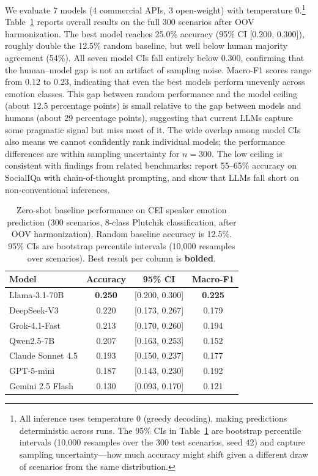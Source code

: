 \documentclass[twoside,11pt]{article}
\begin{document}
We evaluate 7 models (4 commercial APIs, 3 open-weight) with temperature 0.\footnote{All inference uses temperature 0 (greedy decoding), making predictions deterministic across runs. The 95\% CIs in Table~\ref{tab:baselines} are bootstrap percentile intervals (10{,}000 resamples over the 300 test scenarios, seed 42) and capture sampling uncertainty---how much accuracy might shift given a different draw of scenarios from the same distribution.} Table~\ref{tab:baselines} reports overall results on the full 300 scenarios after OOV harmonization. The best model reaches 25.0\% accuracy (95\% CI [0.200, 0.300]), roughly double the 12.5\% random baseline, but well below human majority agreement (54\%). All seven model CIs fall entirely below 0.300, confirming that the human--model gap is not an artifact of sampling noise. Macro-F1 scores range from 0.12 to 0.23, indicating that even the best models perform unevenly across emotion classes. This gap between random performance and the model ceiling (about 12.5 percentage points) is small relative to the gap between models and humans (about 29 percentage points), suggesting that current LLMs capture some pragmatic signal but miss most of it. The wide overlap among model CIs also means we cannot confidently rank individual models; the performance differences are within sampling uncertainty for $n=300$. The low ceiling is consistent with findings from related benchmarks: \citet{sap2022neural} report 55--65\% accuracy on SocialIQa with chain-of-thought prompting, and \citet{hu2023fine} show that LLMs fall short on non-conventional inferences.

\begin{table}[t]
\centering
\caption{Zero-shot baseline performance on CEI speaker emotion prediction (300 scenarios, 8-class Plutchik classification, after OOV harmonization). Random baseline accuracy is 12.5\%. 95\% CIs are bootstrap percentile intervals (10{,}000 resamples over scenarios). Best result per column is \textbf{bolded}.}
\label{tab:baselines}
\small
\begin{tabular}{@{}lccc@{}}
\toprule
\textbf{Model} & \textbf{Accuracy} & \textbf{95\% CI} & \textbf{Macro-F1} \\
\midrule
Llama-3.1-70B & \textbf{0.250} & [0.200, 0.300] & \textbf{0.225} \\
DeepSeek-V3 & 0.220 & [0.173, 0.267] & 0.179 \\
Grok-4.1-Fast & 0.213 & [0.170, 0.260] & 0.194 \\
Qwen2.5-7B & 0.207 & [0.163, 0.253] & 0.152 \\
Claude Sonnet 4.5 & 0.193 & [0.150, 0.237] & 0.177 \\
GPT-5-mini & 0.187 & [0.143, 0.230] & 0.192 \\
Gemini 2.5 Flash & 0.130 & [0.093, 0.170] & 0.121 \\
\bottomrule
\end{tabular}
\end{table}
\end{document}
